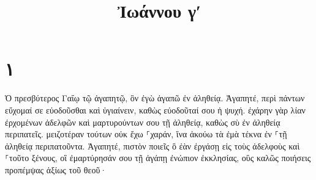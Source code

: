 \documentclass{openreader}
\title{Ἰωάννου γʹ}
\date{}
\begin{document}
\maketitle
\raggedbottom 
\fontsize{16pt}{24pt}\selectfont
\section*{۱}
Ὁ πρεσβύτερος Γαΐῳ τῷ ἀγαπητῷ, ὃν ἐγὼ ἀγαπῶ ἐν ἀληθείᾳ. Ἀγαπητέ, περὶ πάντων εὔχομαί σε εὐοδοῦσθαι καὶ ὑγιαίνειν, καθὼς εὐοδοῦταί σου ἡ ψυχή. ἐχάρην γὰρ λίαν ἐρχομένων ἀδελφῶν καὶ μαρτυρούντων σου τῇ ἀληθείᾳ, καθὼς σὺ ἐν ἀληθείᾳ περιπατεῖς. μειζοτέραν τούτων οὐκ ἔχω ⸀χαράν, ἵνα ἀκούω τὰ ἐμὰ τέκνα ἐν ⸀τῇ ἀληθείᾳ περιπατοῦντα. Ἀγαπητέ, πιστὸν ποιεῖς ὃ ἐὰν ἐργάσῃ εἰς τοὺς ἀδελφοὺς καὶ ⸀τοῦτο ξένους, οἳ ἐμαρτύρησάν σου τῇ ἀγάπῃ ἐνώπιον ἐκκλησίας, οὓς καλῶς ποιήσεις προπέμψας ἀξίως τοῦ θεοῦ· 
\end{document}
